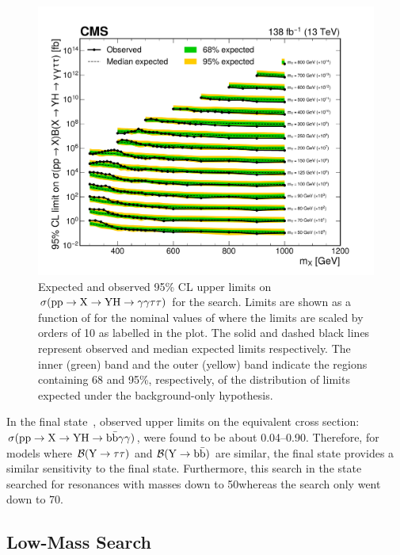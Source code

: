 \begin{figure}
    \centering
    \includegraphics[width=\textwidth]{Figures/Dihiggs/results/limits/limits_stack_my_y_tautau_paper.pdf}
    \caption[\XYttHgg Upper Limits in as Function of \mX in Slices of \mY]{Expected and observed 95\% CL upper limits on $\sigma(\mathrm{p}\mathrm{p} \to \mathrm{X} \to \mathrm{Y}\mathrm{H} \to \gamma\gamma\tau\tau)$ for the \XYttHgg search. Limits are shown as a function of \mX for the nominal values of \mY where the limits are scaled by orders of 10 as labelled in the plot. The solid and dashed black lines represent observed and median expected limits respectively. The inner (green) band and the outer (yellow) band indicate the regions containing 68 and 95\%, respectively, of the distribution of limits expected under the background-only hypothesis.}\label{fig:limits_stack_my_y_tautau}
\end{figure}

In the \bbgg final state~\cite{CMS:2023boe}, observed upper limits on the equivalent cross section: $\sigma(\mathrm{p}\mathrm{p} \to \mathrm{X} \to \mathrm{Y}\mathrm{H} \to \mathrm{b}\bar{\mathrm{b}}\gamma\gamma)$, were found to be about 0.04--0.90\fb. Therefore, for models where $\mathcal{B}(\mathrm{Y} \to \tau\tau)$ and $\mathcal{B}(\mathrm{Y} \to \mathrm{b}\bar{\mathrm{b}})$ are similar, the \ggtt final state provides a similar sensitivity to the \bbgg final state. Furthermore, this search in the \ggtt state searched for \PY resonances with masses down to 50\GeV whereas the \bbgg search only went down to 70\GeV. 

\subsection[Low-Mass \texorpdfstring{\XYggHtt}{XY(tt)H(gg)} Search]{Low-Mass \XYggHtt Search}\label{sec:results_y_gg_low_mass}

